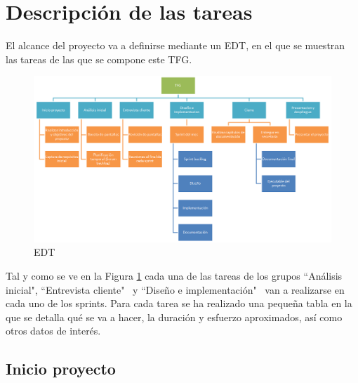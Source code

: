 \section{Descripci\'on de las tareas}
El alcance del proyecto va a definirse mediante un EDT, en el que se muestran las tareas de las
que se compone este TFG.

\begin{figure}[h]
	\centering
	\includegraphics[width=1\linewidth]{./Figures/EDT}
	\caption[Alcance del proyecto]{EDT}
	\label{fig:Alcance}
\end{figure}
Tal y como se ve en la Figura \ref{fig:Alcance} cada una de las tareas de los grupos
``An\'alisis inicial", ``Entrevista cliente" \ y ``Dise\~no e implementaci\'on" \ van a realizarse en cada uno de los sprints.
Para cada tarea se ha realizado una peque\~na tabla en la que se detalla qu\'e se va a hacer,
la duraci\'on y esfuerzo aproximados, as\'i como otros datos de inter\'es.

\subsection{Inicio proyecto}
